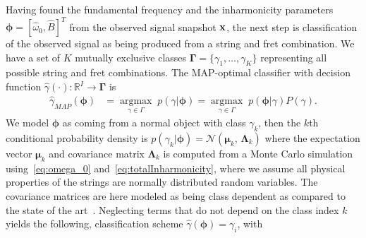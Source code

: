 \documentclass{article}
\begin{document}
\begin{sloppy}
Having found the fundamental frequency and the inharmonicity parameters $\boldsymbol{\phi} = [\widehat{\omega}_0, \widehat{B} ]^T$ from the observed signal snapshot $\mathbf x$, the next step is classification of the observed signal as being produced from a string and fret combination. 
We have a set of $K$ mutually exclusive classes $\boldsymbol{\Gamma}=\{\gamma_1,\dots,\gamma_K\}$ representing all possible string and fret combinations. The MAP-optimal classifier with decision function $\hat{\gamma}(\cdot): \mathbb{R}^I \rightarrow \boldsymbol{\Gamma}  $ is 
\begin{align}
    \hat\gamma_{{MAP}}(\boldsymbol{\phi}) &= \underset{\gamma\in\Gamma}{\operatorname{argmax}}\;{p(\gamma|\boldsymbol{\phi})} = \underset{\gamma\in\Gamma}{\operatorname{argmax}}\;{p(\boldsymbol{\phi}|\gamma)P(\gamma)}.
\end{align}
We model $\boldsymbol{\phi}$ as coming from a normal object with class $\gamma_k$, then the $k$th conditional probability density is   
    $p(\gamma_k\lvert\boldsymbol{\phi}) =
    \mathcal{N}(\boldsymbol{\mu}_k,\,\boldsymbol{\Lambda}_k)$ %
where the expectation vector $\boldsymbol{\mu}_k$ and covariance matrix $\boldsymbol{ \Lambda }_k$ is computed from a Monte Carlo simulation using~\eqref{eq:omega_0} and~\eqref{eq:totalInharmonicity}, where we assume all physical properties of the strings are normally distributed random variables. The covariance matrices are here modeled as being class dependent as compared to the state of the art~\cite{hjerrild::icassp19}. %
%
Neglecting terms that do not depend on the class index $k$ yields the following, classification scheme $\hat{\gamma}(\boldsymbol{\phi})={\gamma}_i$, with
%
\begin{equation}\label{eq:classifier}

\end{equation}
\end{sloppy}
\end{document}
